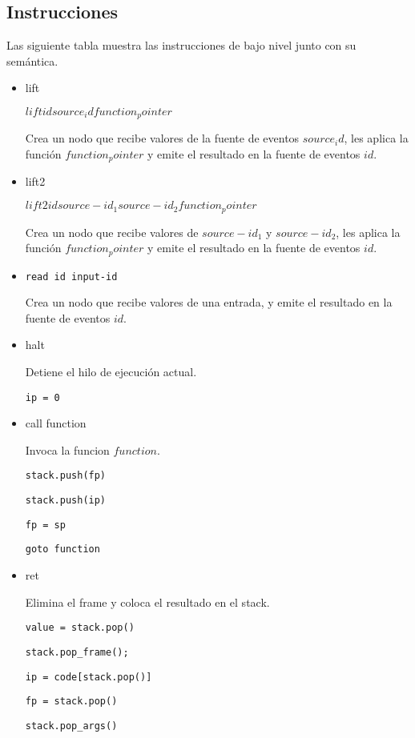 \subsection{Instrucciones}

Las siguiente tabla muestra las instrucciones de bajo nivel junto con su semántica.

\begin{itemize}
\item lift

 $lift id source_id function_pointer$

 Crea un nodo que recibe valores de la fuente de
 eventos $source_id$,
 les aplica la función $function_pointer$ y emite el resultado
 en la fuente de eventos $id$.

\item lift2

 $lift2 id source-id_1 source-id_2 function_pointer$

 Crea un nodo que recibe valores de $source-id_1$ y
 $source-id_2$,
 les aplica la función $function_pointer$ y emite el resultado
 en la fuente de eventos $id$.

\item \texttt{read id input-id}

 Crea un nodo que recibe valores de una entrada,
 y emite el resultado en la fuente de eventos $id$.

\item halt

  Detiene el hilo de ejecución actual.

  \texttt{ip = 0} 

\item call function

  Invoca la funcion $function$.

  \texttt{stack.push(fp)}

  \texttt{stack.push(ip)}

  \texttt{fp = sp}

  \texttt{goto function}

\item ret

  Elimina el frame y coloca el resultado en el stack.

  \texttt{value = stack.pop()}

  \texttt{stack.pop_frame();}

  \texttt{ip = code[stack.pop()]}

  \texttt{fp = stack.pop()}

  \texttt{stack.pop_args()}


\end{itemize}
